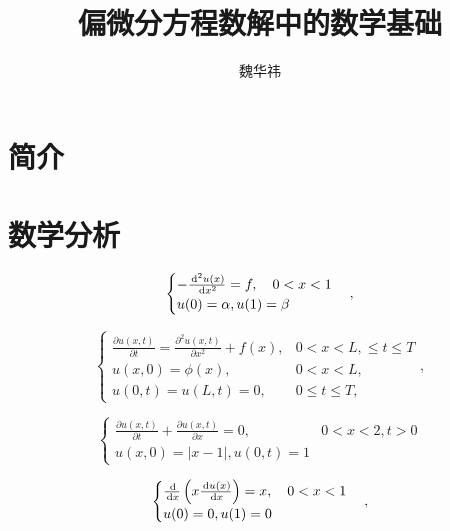 \documentclass{article}
\begin{document}
\title{偏微分方程数解中的数学基础}
\author{魏华祎}
\date{\chntoday}
\maketitle
\section{简介}

\section{数学分析}

\begin{equation*}
    \begin{cases}
        -\frac{\,\mathrm d^2 u(x)}{\,\mathrm d x^2} = f, \quad 0 < x < 1 \\
        u(0) = \alpha, u(1) = \beta
    \end{cases},
\end{equation*}

\begin{equation*}
    \begin{cases}
        \frac{\partial u(x, t)}{\partial t} = 
        \frac{\partial^2 u(x, t)}{\partial x^2} + f(x), & 0< x < L, \leq t \leq T \\
        u(x, 0) = \phi(x), & 0 < x < L,\\
        u(0, t) = u(L, t) = 0, & 0 \leq t \leq T,
    \end{cases},
\end{equation*}

\begin{equation*}
    \begin{cases}
        \frac{\partial u(x, t)}{\partial t} + 
        \frac{\partial u(x, t)}{\partial x} = 0, & 0 < x < 2, t > 0\\
        u(x, 0) = |x - 1|, u(0, t) = 1
    \end{cases}
\end{equation*}

\begin{equation*}
    \begin{cases}
        \frac{\,\mathrm d}{\,\mathrm d x}\left(x\frac{\,\mathrm d u(x)}{\,\mathrm d x}\right) = x, \quad 0 < x < 1 \\
        u(0) = 0, u(1) = 0 
    \end{cases},
\end{equation*}
\end{document}
